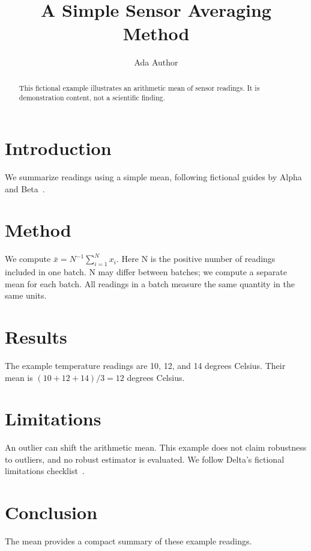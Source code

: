 \documentclass[journal]{IEEEtran}
\title{A Simple Sensor Averaging Method}
\author{Ada Author}
\begin{document}
\maketitle
\begin{abstract}
This fictional example illustrates an arithmetic mean of sensor readings.
It is demonstration content, not a scientific finding.
\end{abstract}
\section{Introduction}
We summarize readings using a simple mean, following fictional guides
by Alpha~\cite{guide} and Beta~\cite{method}.
\section{Method}\label{sec:method}
We compute $\bar{x}=N^{-1}\sum_{i=1}^{N}x_i$.
Here N is the positive number of readings included in one batch.
N may differ between batches; we compute a separate mean for each batch.
All readings in a batch measure the same quantity in the same units.
\section{Results}\label{sec:results}
The example temperature readings are 10, 12, and 14 degrees Celsius.
Their mean is $(10+12+14)/3=12$ degrees Celsius.
\section{Limitations}\label{sec:limitations}
An outlier can shift the arithmetic mean. This example does not claim
robustness to outliers, and no robust estimator is evaluated.
We follow Delta's fictional limitations checklist~\cite{limits}.
\section{Conclusion}
The mean provides a compact summary of these example readings.


\end{document}

